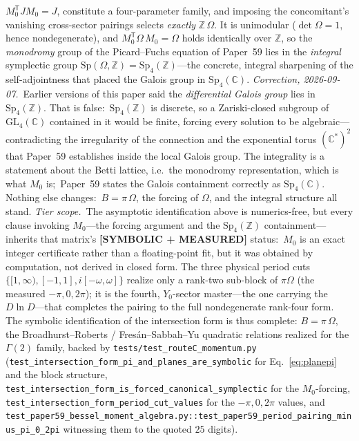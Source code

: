\documentclass[aps,pra,twocolumn,superscriptaddress,longbibliography]{revtex4-2}
\begin{document}
$M_{0}^{\mathsf T}J M_{0}=J$, constitute a four-parameter family, and imposing the
concomitant's vanishing cross-sector pairings selects \emph{exactly}
$\mathbb{Z}\,\Omega$.  It is unimodular ($\det\Omega=1$, hence nondegenerate), and
$M_{0}^{\mathsf T}\Omega\,M_{0}=\Omega$ holds identically over $\mathbb{Z}$, so the
\emph{monodromy} group of the Picard--Fuchs equation of Paper~59 lies in the
\emph{integral} symplectic group
$\mathrm{Sp}(\Omega,\mathbb{Z})=\mathrm{Sp}_{4}(\mathbb{Z})$---the concrete,
integral sharpening of the self-adjointness that placed the Galois group in
$\mathrm{Sp}_{4}(\mathbb{C})$.
%
\emph{Correction, 2026-09-07.}\ Earlier versions of this paper said the
\emph{differential Galois group} lies in $\mathrm{Sp}_{4}(\mathbb{Z})$. That is
false:\ $\mathrm{Sp}_{4}(\mathbb{Z})$ is discrete, so a Zariski-closed subgroup
of $\mathrm{GL}_{4}(\mathbb{C})$ contained in it would be finite, forcing every
solution to be algebraic---contradicting the irregularity of the connection and
the exponential torus $(\mathbb{C}^{*})^{2}$ that Paper~59 establishes inside
the local Galois group. The integrality is a statement about the Betti lattice,
i.e.\ the monodromy representation, which is what $M_{0}$ is;\ Paper~59 states
the Galois containment correctly as $\mathrm{Sp}_{4}(\mathbb{C})$. Nothing else
changes:\ $B=\pi\,\Omega$, the forcing of $\Omega$, and the integral structure
all stand.
\emph{Tier scope.}\ The asymptotic identification above is numerics-free, but
every clause invoking $M_{0}$---the forcing argument and the $\mathrm{Sp}_{4}(\mathbb{Z})$
containment---inherits that matrix's \textbf{[SYMBOLIC + MEASURED]} status:\ $M_{0}$
is an exact integer certificate rather than a floating-point fit, but it was
obtained by computation, not derived in closed form.  The
three physical period cuts $\{[1,\infty),[-1,1],i[-\omega,\omega]\}$ realize only a
rank-two sub-block of $\pi\Omega$ (the measured $-\pi,0,2\pi$); it is the fourth,
$Y_{0}$-sector master---the one carrying the $D\ln D$---that completes the pairing to
the full nondegenerate rank-four form.  The symbolic identification of the
intersection form is thus complete: $B=\pi\,\Omega$, the Broadhurst--Roberts /
Fresán--Sabbah--Yu quadratic relations realized for the $\Gamma(2)$ family, backed by
\texttt{tests/test\_routeC\_momentum.py} (\texttt{test\_intersection\_form\_pi\_and\_planes\_are\_symbolic}
for Eq.~\eqref{eq:planepi} and the block structure,
\texttt{test\_intersection\_form\_is\_forced\_canonical\_symplectic} for the
$M_{0}$-forcing, \texttt{test\_intersection\_form\_period\_cut\_values} for the
$-\pi,0,2\pi$ values, and
\texttt{test\_paper59\_bessel\_moment\_algebra.py::test\_paper59\_period\_pairing\_minus\_pi\_0\_2pi}
witnessing them to the quoted $25$ digits).
\end{document}
